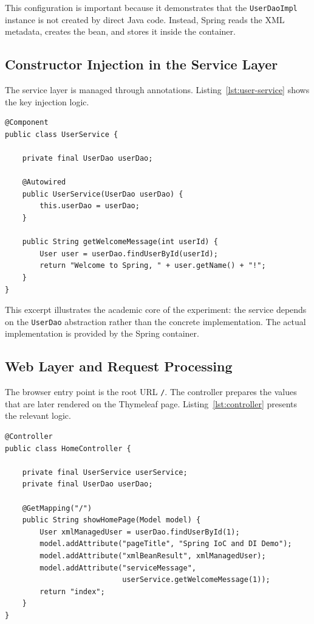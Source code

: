 \documentclass[12pt,a4paper]{article}
\begin{document}
This configuration is important because it demonstrates that the \texttt{UserDaoImpl} instance is not created by direct Java code. Instead, Spring reads the XML metadata, creates the bean, and stores it inside the container.

\subsection{Constructor Injection in the Service Layer}
The service layer is managed through annotations. Listing~\ref{lst:user-service} shows the key injection logic.

\begin{lstlisting}[style=javastyle, caption={Selective excerpt from UserService}, label={lst:user-service}]
@Component
public class UserService {

    private final UserDao userDao;

    @Autowired
    public UserService(UserDao userDao) {
        this.userDao = userDao;
    }

    public String getWelcomeMessage(int userId) {
        User user = userDao.findUserById(userId);
        return "Welcome to Spring, " + user.getName() + "!";
    }
}
\end{lstlisting}

This excerpt illustrates the academic core of the experiment: the service depends on the \texttt{UserDao} abstraction rather than the concrete implementation. The actual implementation is provided by the Spring container.

\subsection{Web Layer and Request Processing}
The browser entry point is the root URL \texttt{/}. The controller prepares the values that are later rendered on the Thymeleaf page. Listing~\ref{lst:controller} presents the relevant logic.

\begin{lstlisting}[style=javastyle, caption={Selective excerpt from HomeController}, label={lst:controller}]
@Controller
public class HomeController {

    private final UserService userService;
    private final UserDao userDao;

    @GetMapping("/")
    public String showHomePage(Model model) {
        User xmlManagedUser = userDao.findUserById(1);
        model.addAttribute("pageTitle", "Spring IoC and DI Demo");
        model.addAttribute("xmlBeanResult", xmlManagedUser);
        model.addAttribute("serviceMessage",
                           userService.getWelcomeMessage(1));
        return "index";
    }
}
\end{lstlisting}
\end{document}
